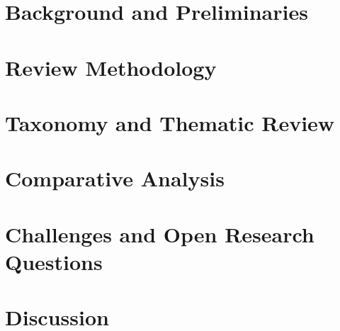 \documentclass[sigconf]{acmart}
\begin{document}
\section{Background and Preliminaries}

\section{Review Methodology}

\section{Taxonomy and Thematic Review}

\section{Comparative Analysis}

\section{Challenges and Open Research Questions}

\section{Discussion}
\end{document}
